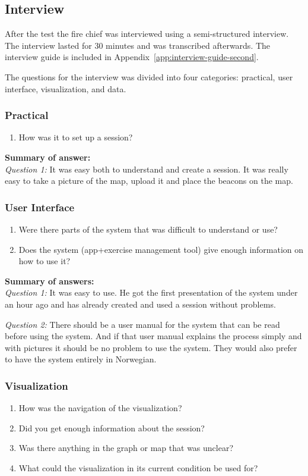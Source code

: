 \documentclass[../Main/thesis.tex]{subfiles}
\begin{document}
\subsection{Interview}
After the test the fire chief was interviewed using a semi-structured interview.
The interview lasted for 30 minutes and was transcribed afterwards.
The interview guide is included in Appendix~\ref{app:interview-guide-second}.

The questions for the interview was divided into four categories: practical, user interface, visualization, and data.

\subsubsection*{Practical}
\begin{enumerate}
	\item How was it to set up a session?

		
\end{enumerate}

\textbf{Summary of answer:}\\
\textit{Question 1:}
It was easy both to understand and create a session. 
It was really easy to take a picture of the map, upload it and place the beacons on the map.

\subsubsection*{User Interface}
\begin{enumerate}
	\item Were there parts of the system that was difficult to understand or use?
	\item Does the system (app+exercise management tool) give enough information on how to use it?
\end{enumerate}

\textbf{Summary of answers:}\\
\textit{Question 1:}
It was easy to use. 
He got the first presentation of the system under an hour ago and has already created and used a session without problems.

\textit{Question 2:}
There should be a user manual for the system that can be read before using the system. 
And if that user manual explains the process simply and with pictures it should be no problem to use the system.
They would also prefer to have the system entirely in Norwegian. 

\subsubsection*{Visualization}
\begin{enumerate}
	\item How was the navigation of the visualization?
	\item Did you get enough information about the session?
	\item Was there anything in the graph or map that was unclear?
	\item What could the visualization in its current condition be used for?
\end{enumerate}
\end{document}
